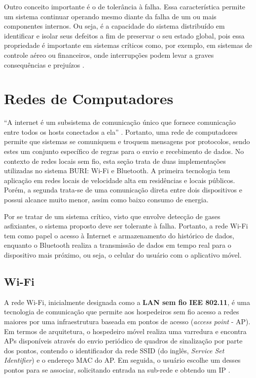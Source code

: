 Outro conceito importante é o de tolerância à falha. Essa característica permite um sistema continuar operando mesmo diante da falha de um ou mais 
componentes internos. Ou seja, é a capacidade do sistema distribuído em identificar e isolar seus defeitos a fim de preservar o seu estado global, pois essa propriedade é 
importante em sistemas críticos como, por exemplo, em sistemas de controle aéreo ou financeiros, onde interrupções podem levar a graves consequências e prejuízos \cite[pp. 528]{sistemas-distribuidos-coulouris2013}.

\section{Redes de Computadores}

``A internet é um subsistema de comunicação único que fornece comunicação entre todos os hosts conectados a ela'' \cite[pp. 96]{sistemas-distribuidos-coulouris2013}. Portanto, uma rede de computadores 
permite que sistemas se comuniquem e troquem mensagens por protocolos, sendo estes um conjunto específico de regras para o envio e recebimento de dados. No contexto de redes locais sem fio, esta seção trata de duas 
implementações utilizadas no sistema BURI: Wi-Fi e Bluetooth. A primeira tecnologia tem aplicação em redes locais de velocidade alta em residências e locais públicos. Porém, a segunda trata-se de uma comunicação direta entre dois 
dispositivos e possui alcance muito menor, assim como baixo consumo de energia.

Por se tratar de um sistema crítico, visto que envolve detecção de gases asfixiantes, o sistema proposto deve ser tolerante à falha. Portanto, a rede Wi-Fi tem como papel o acesso à Internet e armazenamento do histórico de dados, enquanto o 
Bluetooth realiza a transmissão de dados em tempo real para o dispositivo mais próximo, ou seja, o celular do usuário com o aplicativo móvel.

\subsection{Wi-Fi}

A rede Wi-Fi, inicialmente designada como a \textbf{LAN sem fio IEE 802.11}, é uma tecnologia de comunicação 
que permite aos hospedeiros sem fio acesso a redes maiores por uma infraestrutura baseada em pontos de acesso (\textit{access point} - AP). Em termos 
de arquitetura, o hospedeiro móvel realiza uma varredura e encontra APs disponíveis através do envio periódico de quadros de sinalização por parte dos pontos, contendo o identificador da 
rede SSID (do inglês, \textit{Service Set Identifier}) e o endereço MAC do AP. Em seguida, o usuário escolhe um desses pontos para 
se associar, solicitando entrada na sub-rede e obtendo um IP \cite{redeskurose2010}. 

